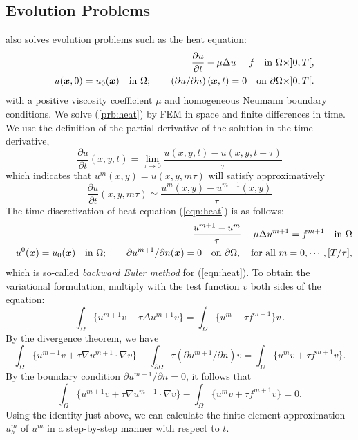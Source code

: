 \documentclass[a4paper,twoside,12pt]{book}
\def\key#1{\emph{#1}\index{#1}}
\def\vec#1{\mbox{\boldmath $#1$}}
\def\p{\partial}
\def\setS#1{#1\label{sec:#1}}
\begin{document}
\subsection{\setS{Evolution Problems}}
\freefempp also solves evolution problems such as the heat equation:
\begin{eqnarray}
\label{prb:heat}
&&\frac{\p u}{\p t}-\mu\Delta u=f\quad \textrm{in }\Omega\times ]0,T[,\\
&&u(\vec x,0)=u_0(\vec x)\quad \textrm{in }\Omega; \qquad
\left(\p u/\p n\right)(\vec x,t)=0\quad\textrm{on }\p\Omega\times ]0,T[.\nonumber
\end{eqnarray}
with a positive viscosity coefficient $\mu$ and homogeneous Neumann boundary conditions.
We solve (\ref{prb:heat}) by FEM in space and finite differences in time.
We use the definition of the partial derivative of the solution in the time
derivative,
\[
\frac{\p u}{\p t}(x,y,t) = \lim_{\tau \to 0}
\frac{u(x,y,t)-u(x,y,t-\tau )}{\tau }
\]
which indicates that $u^m(x,y)=u(x,y,m\tau )$ will satisfy approximatively
\[
\frac{\p u}{\p t}(x,y,m\tau )\simeq \frac{u^m(x,y)-u^{m-1}(x,y)}{\tau }
\]
The time discretization of heat equation (\ref{eqn:heat}) is as follows:
\begin{eqnarray}
\label{eqn:heat}
&&\frac{u^{m+1}-u^{m}}{\tau }-\mu\Delta u^{m+1}=f^{m+1}
\quad \textrm{in }\Omega\\
&&u^0(\vec x)=u_0(\vec x)\quad \textrm{in }\Omega; \qquad
\p u^{m+1}/\p n(\vec x)=0\quad\textrm{on }\p\Omega,\quad
\textrm{for all }m=0,\cdots,[T/\tau ],\nonumber
\end{eqnarray}
which is so-called \key{backward Euler method} for (\ref{eqn:heat}).
To obtain the variational formulation, multiply with the test function $v$ both sides of the equation:
\begin{equation*}
\int_{\Omega }\{u^{m+1}v-\tau \Delta u^{m+1}v\}
=\int_{\Omega }\{u^m+\tau  f^{m+1}\}v\, .
\end{equation*}%
By the divergence theorem, we have
\begin{equation*}
\int_{\Omega} \{u^{m+1}v+\tau \nabla u^{m+1}\cdot \nabla v\}
-\int_{\p\Omega} \tau \left( \p u^{m+1}/\p n\right) v=\int_{\Omega }\{u^mv+\tau f^{m+1}v\}.
\end{equation*}%
By the boundary condition $\p u^{m+1}/\p n=0$, it follows that
\begin{equation}
\label{eqn:BackEuler}
\int_{\Omega} \{u^{m+1}v+\tau \nabla u^{m+1}\cdot \nabla v\}-
\int_{\Omega }\{u^mv+\tau f^{m+1}v\}=0.
\end{equation}%
Using the identity just above, we can calculate the finite element
approximation $u_h^m$ of $u^m$ in a step-by-step manner with respect to $t$.
\end{document}
